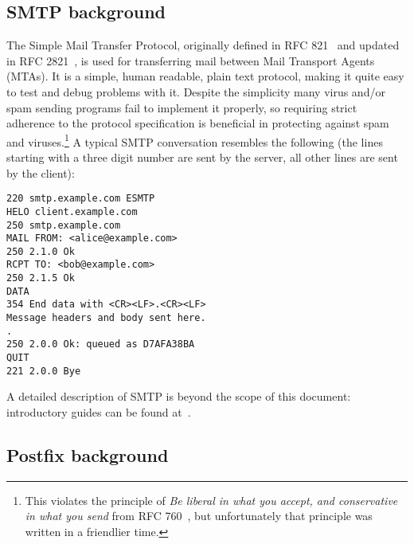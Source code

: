 \documentclass[a4paper,12pt,draft]{article}
\begin{document}
\subsection{SMTP background}
\label{smtp background}

The Simple Mail Transfer Protocol, originally defined in RFC
821~\cite{RFC821} and updated in RFC 2821~\cite{RFC2821}, is used for
transferring mail between Mail Transport Agents (MTAs).  It is a simple,
human readable, plain text protocol, making it quite easy to test and debug
problems with it.  Despite the simplicity many virus and/or spam sending
programs fail to implement it properly, so requiring strict adherence to
the protocol specification is beneficial in protecting against spam and
viruses.\footnote{This violates the principle of \textit{Be liberal in what
you accept, and conservative in what you send\/} from RFC
760~\cite{rfc760}, but unfortunately that principle was written in a
friendlier time.}  A typical SMTP conversation resembles the following (the
lines starting with a three digit number are sent by the server, all other
lines are sent by the client):

\begin{verbatim}
220 smtp.example.com ESMTP
HELO client.example.com
250 smtp.example.com
MAIL FROM: <alice@example.com>
250 2.1.0 Ok
RCPT TO: <bob@example.com>
250 2.1.5 Ok
DATA
354 End data with <CR><LF>.<CR><LF>
Message headers and body sent here.
.
250 2.0.0 Ok: queued as D7AFA38BA
QUIT
221 2.0.0 Bye
\end{verbatim}

A detailed description of SMTP is beyond the scope of this document:
introductory guides can be found at~\cite{smtp-intro-01, smtp-intro-02}.

\subsection{Postfix background}
\end{document}

